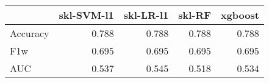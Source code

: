 \begin{tabular}{lrrrr}
\toprule
{} &  skl-SVM-l1 &  skl-LR-l1 &  skl-RF &  xgboost \\
\midrule
Accuracy &       0.788 &      0.788 &   0.788 &    0.788 \\
F1w      &       0.695 &      0.695 &   0.695 &    0.695 \\
AUC      &       0.537 &      0.545 &   0.518 &    0.534 \\
\bottomrule
\end{tabular}
